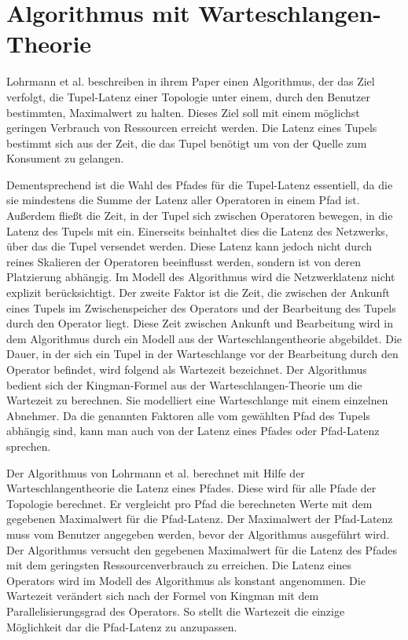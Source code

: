 \chapter{Algorithmus mit Warteschlangen-Theorie}

Lohrmann et al. beschreiben in ihrem Paper \cite{lohrmann_elastic_2015} einen Algorithmus, der das Ziel verfolgt, die Tupel-Latenz einer Topologie unter einem, durch den Benutzer bestimmten, Maximalwert zu halten.
Dieses Ziel soll mit einem möglichst geringen Verbrauch von Ressourcen erreicht werden.
Die Latenz eines Tupels bestimmt sich aus der Zeit, die das Tupel benötigt um von der Quelle zum Konsument zu gelangen.

Dementsprechend ist die Wahl des Pfades für die Tupel-Latenz essentiell, da die sie mindestens die Summe der Latenz aller Operatoren in einem Pfad ist.
Außerdem fließt die Zeit, in der Tupel sich zwischen Operatoren bewegen, in die Latenz des Tupels mit ein.
Einerseits beinhaltet dies die Latenz des Netzwerks, über das die Tupel versendet werden.
Diese Latenz kann jedoch nicht durch reines Skalieren der Operatoren beeinflusst werden, sondern ist von deren Platzierung abhängig.
Im Modell des Algorithmus wird die Netzwerklatenz nicht explizit berücksichtigt.
Der zweite Faktor ist die Zeit, die zwischen der Ankunft eines Tupels im Zwischenspeicher des Operators und der Bearbeitung des Tupels durch den Operator liegt.
Diese Zeit zwischen Ankunft und Bearbeitung wird in dem Algorithmus durch ein Modell aus der Warteschlangentheorie abgebildet.
Die Dauer, in der sich ein Tupel in der Warteschlange vor der Bearbeitung durch den Operator befindet, wird folgend als Wartezeit bezeichnet.
Der Algorithmus bedient sich der Kingman-Formel aus der Warteschlangen-Theorie um die Wartezeit zu berechnen.
Sie modelliert eine Warteschlange mit einem einzelnen Abnehmer.
Da die genannten Faktoren alle vom gewählten Pfad des Tupels abhängig sind, kann man auch von der Latenz eines Pfades oder Pfad-Latenz sprechen.

Der Algorithmus von Lohrmann et al. berechnet mit Hilfe der Warteschlangentheorie die Latenz eines Pfades.
Diese wird für alle Pfade der Topologie berechnet.
Er vergleicht pro Pfad die berechneten Werte mit dem gegebenen Maximalwert für die Pfad-Latenz.
Der Maximalwert der Pfad-Latenz muss vom Benutzer angegeben werden, bevor der Algorithmus ausgeführt wird.
Der Algorithmus versucht den gegebenen Maximalwert für die Latenz des Pfades mit dem geringsten Ressourcenverbrauch zu erreichen.
Die Latenz eines Operators wird im Modell des Algorithmus als konstant angenommen. 
Die Wartezeit verändert sich nach der Formel von Kingman mit dem Parallelisierungsgrad des Operators.
So stellt die Wartezeit die einzige Möglichkeit dar die Pfad-Latenz zu anzupassen.

